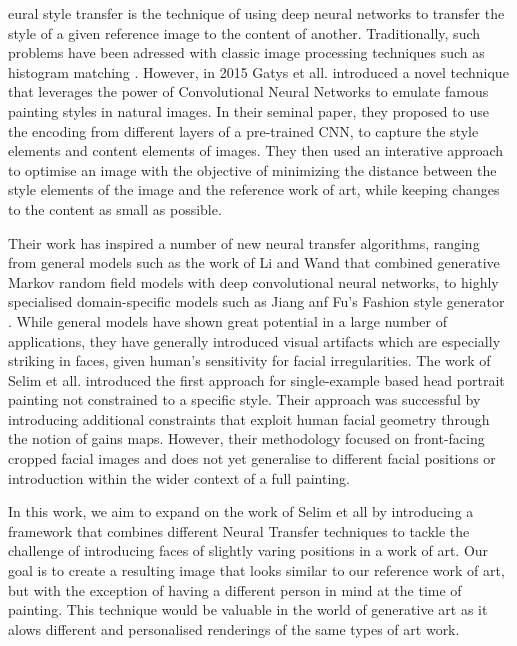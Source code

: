 \documentclass{pnastwo2}
\begin{document}
\begin{article}
eural style transfer is the technique of using deep neural networks to transfer the style of a given reference image to the content of another. Traditionally, such problems have been adressed with classic image processing techniques such as histogram matching \cite{neumann2005color}. However, in 2015 Gatys et all. \cite{gatys2015neural} introduced a novel technique that leverages the power of Convolutional Neural Networks to emulate famous painting styles in natural images. In their seminal paper, they proposed to use the encoding from different layers of a pre-trained CNN, to capture the style elements and content elements of images. They then used an interative approach to optimise an image with the objective of minimizing the distance between the style elements of the image and the reference work of art, while keeping changes to the content as small as possible. 
\par
Their work has inspired a number of new neural transfer algorithms, ranging from general models such as the work of Li and Wand \cite{li2016combining} that combined generative Markov random field models with deep convolutional neural networks, to highly specialised domain-specific models such as Jiang anf Fu's Fashion style generator \cite{jiang2017fashion}. While general models have shown great potential in a large number of applications, they have generally introduced visual artifacts which are especially striking in faces, given human's sensitivity for facial irregularities. The work of Selim et all. \cite{selim2016painting} introduced the first approach for single-example based head portrait painting not constrained to a specific style. Their approach was successful by introducing additional constraints that exploit human facial geometry through the notion of gains maps. However, their methodology focused on front-facing cropped facial images and does not yet generalise to different facial positions or introduction within the wider context of a full painting. 
\par
In this work, we aim to expand on the work of Selim et all by introducing a framework that combines different Neural Transfer techniques to tackle the challenge of introducing faces of slightly varing positions in a work of art. Our goal is to create a resulting image that looks similar to our reference work of art, but with the exception of having a different person in mind at the time of painting. This technique would be valuable in the world of generative art as it alows different and personalised renderings of the same types of art work. 


\end{article}
\end{document}
